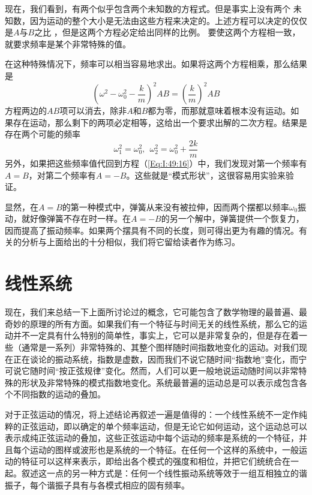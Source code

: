 现在，我们看到，有两个似乎包含两个未知数的方程式。但是事实上没有两个 未知数，因为运动的整个大小是无法由这些方程来决定的。上述方程可以决定的仅仅是$A$与$B$之比 ，但是这两个方程必定给出同样的比例。 要使这两个方程相一致，就要求频率是某个非常特殊的值。

在这种特殊情况下，频率可以相当容易地求出。如果将这两个方程相乘，那么结果是
\begin{equation}
    \label{Eq:I:49:17}
    \left(\omega^2 - \omega_0^2 - \frac{k}{m}\right)^2AB = \left(\frac{k}{m}\right)^2AB 
\end{equation}
方程两边的$AB$项可以消去，除非$A$和$B$都为零，而那就意味着根本没有运动。如果存在运动，那么剩下的两项必定相等，这给出一个要求出解的二次方程。结果是存在两个可能的频率
\begin{equation}
    \label{Eq:I:49:18}
    \omega_1^2 = \omega_0^2,~~\omega_2^2 = \omega_0^2 + \frac{2k}{m}
\end{equation}
另外，如果把这些频率值代回到方程（\ref{Eq:I:49:16}）中，我们发现对第一个频率有$A=B$，对第二个频率有$A=-B$。这些就是“模式形状”，这很容易用实验来验证。

显然，在$A=B$的第一种模式中，弹簧从来没有被拉伸，因而两个摆都以频率$\omega_0$振动，就好像弹簧不存在时一样。在$A=-B$的另一个解中，弹簧提供一个恢复力，因而提高了振动频率。如果两个摆具有不同的长度，则可得出更为有趣的情况。有关的分析与上面给出的十分相似，我们将它留给读者作为练习。

\section{线性系统}

现在，我们来总结一下上面所讨论过的概念，它可能包含了数学物理的最普遍、最奇妙的原理的所有方面。如果我们有一个特征与时间无关的线性系统，那么它的运动并不一定具有什么特别的简单性，事实上，它可以是非常复杂的，但是存在着一些（通常是一系列）非常特殊的、其整个图样随时间指数地变化的运动。对我们现在正在谈论的振动系统，指数是虚数，因而我们不说它随时间“指数地”变化，而宁可说它随时间“按正弦规律”变化。然而，人们可以更一般地说运动随时间以非常特殊的形状及非常特殊的模式指数地变化。系统最普遍的运动总是可以表示成包含各个不同指数的运动的叠加。

对于正弦运动的情况，将上述结论再叙述一遍是值得的：一个线性系统不一定作纯粹的正弦运动，即以确定的单个频率运动，但是无论它如何运动，这个运动总可以表示成纯正弦运动的叠加，这些正弦运动中每个运动的频率是系统的一个特征，并且每个运动的图样或波形也是系统的一个特征。在任何一个这样的系统中，一般运动的特征可以这样来表示，即给出各个模式的强度和相位，并把它们统统合在一起。叙述这一点的另一种方式是：任何一个线性振动系统等效于一组互相独立的谐振子，每个谐振子具有与各模式相应的固有频率。


